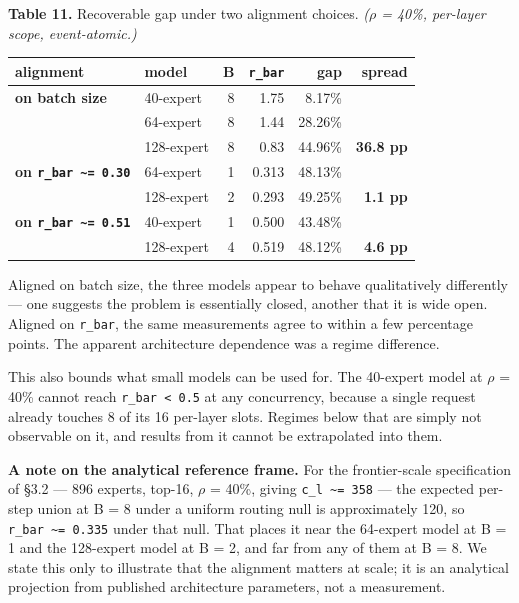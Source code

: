 \documentclass[
  10pt,
  letterpaper,
  10pt]{article}
\newcounter{none} %
\begin{document}
\textbf{Table 11.} Recoverable gap under two alignment choices.
\emph{(\(\rho\) = 40\%, per-layer scope, event-atomic.)}

{\def\LTcaptype{none} %
\begin{longtable}[]{@{}llrrrr@{}}
\toprule\noalign{}
alignment & model & B & \texttt{r\_bar} & gap & spread \\
\midrule\noalign{}
\endhead
\bottomrule\noalign{}
\endlastfoot
\textbf{on batch size} & 40-expert & 8 & 1.75 & 8.17\% & \\
& 64-expert & 8 & 1.44 & 28.26\% & \\
& 128-expert & 8 & 0.83 & 44.96\% & \textbf{36.8 pp} \\
\textbf{on \texttt{r\_bar\ \textasciitilde{}=\ 0.30}} & 64-expert & 1 &
0.313 & 48.13\% & \\
& 128-expert & 2 & 0.293 & 49.25\% & \textbf{1.1 pp} \\
\textbf{on \texttt{r\_bar\ \textasciitilde{}=\ 0.51}} & 40-expert & 1 &
0.500 & 43.48\% & \\
& 128-expert & 4 & 0.519 & 48.12\% & \textbf{4.6 pp} \\
\end{longtable}
}

Aligned on batch size, the three models appear to behave qualitatively
differently --- one suggests the problem is essentially closed, another
that it is wide open. Aligned on \texttt{r\_bar}, the same measurements
agree to within a few percentage points. The apparent architecture
dependence was a regime difference.

This also bounds what small models can be used for. The 40-expert model
at \(\rho\) = 40\% cannot reach \texttt{r\_bar\ \textless{}\ 0.5} at any
concurrency, because a single request already touches 8 of its 16
per-layer slots. Regimes below that are simply not observable on it, and
results from it cannot be extrapolated into them.

\textbf{A note on the analytical reference frame.} For the
frontier-scale specification of §3.2 --- 896 experts, top-16, \(\rho\) =
40\%, giving \texttt{c\_l\ \textasciitilde{}=\ 358} --- the expected
per-step union at B = 8 under a uniform routing null is approximately
120, so \texttt{r\_bar\ \textasciitilde{}=\ 0.335} under that null. That
places it near the 64-expert model at B = 1 and the 128-expert model at
B = 2, and far from any of them at B = 8. We state this only to
illustrate that the alignment matters at scale; it is an analytical
projection from published architecture parameters, not a measurement.
\end{document}
